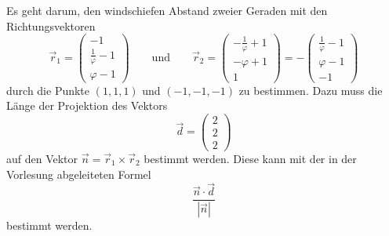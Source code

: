 \begin{loesung}
Es geht darum, den windschiefen Abstand zweier Geraden mit den
Richtungsvektoren
\[
\vec r_1=\begin{pmatrix}
-1\\
\frac1{\varphi}-1\\
\varphi-1
\end{pmatrix}
\qquad\text{und}\qquad
\vec r_2
=\begin{pmatrix}
-\frac1{\varphi}+1\\
-\varphi+1\\
1
\end{pmatrix}
=-\begin{pmatrix}
\frac1{\varphi}-1\\
\varphi-1\\
-1
\end{pmatrix}
\]
durch die Punkte $(1,1,1)$ und $(-1,-1,-1)$ zu bestimmen. Dazu
muss die Länge der Projektion des Vektors
\[
\vec d= \begin{pmatrix} 2\\2\\2\end{pmatrix}
\]
auf den Vektor $\vec n = \vec r_1\times\vec r_2$ bestimmt werden.
Diese kann mit der in der Vorlesung abgeleiteten Formel
\[
\frac{\vec  n\cdot\vec d}{|\vec n|}
\]
bestimmt werden.


\end{loesung}
